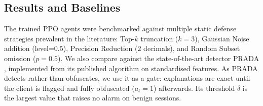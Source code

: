 \documentclass[conference]{IEEEtran}
\DeclareRobustCommand{\rev}[1]{{\color{blue}#1}}
\begin{document}
\subsection{Results and Baselines}
\label{sec:results}
The trained PPO agents were benchmarked against multiple static defense strategies prevalent in the literature: Top-$k$ truncation ($k=3$), Gaussian Noise addition (level=$0.5$), Precision Reduction ($2$ decimals), and Random Subset omission ($p=0.5$). \rev{We also compare against the state-of-the-art detector PRADA \cite{b17}, implemented from its published algorithm on standardised features. As PRADA detects rather than obfuscates, we use it as a gate: explanations are exact until the client is flagged and fully obfuscated ($a_t=1$) afterwards. Its threshold $\delta$ is the largest value that raises no alarm on benign sessions.}
\end{document}
